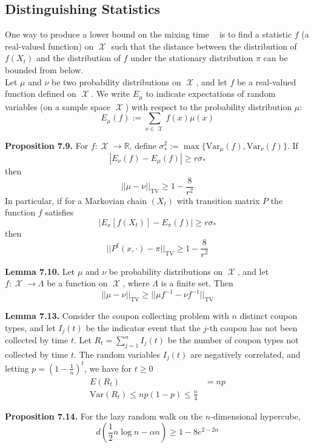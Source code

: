 \documentclass[12pt]{article}
\DeclareMathOperator*{\TV}{\text{TV}}
\DeclareMathOperator*{\mix}{t_{\text{mix}}}
\DeclareMathOperator*{\X}{\mathcal{X}}
\begin{document}
\subsection{Distinguishing Statistics}

One way to produce a lower bound on the mixing time $\mix$ is to find a statistic $f$ (a real-valued function) on $\X$ such that the distance between the distribution of $f(X_t)$ and the distribution of $f$ under the stationary distribution $\pi$ can be bounded from below.\\

Let $\mu$ and $\nu$ be two probability distributions on $\X$, and let $f$ be a real-valued function defined on $\X$. We write $E_{\mu}$ to indicate expectations of random variables (on a sample space $\X$) with respect to the probability distribution $\mu$: $$E_{\mu}(f) := \sum_{x \in \X} f(x) \mu(x)$$

\textbf{Proposition 7.9.} For $f: \X \to \mathbb{R}$, define $\sigma_*^2 := \max\{\text{Var}_{\mu}(f), \text{Var}_{\nu}(f)\}$. If $$|E_{\nu}(f) - E_{\mu}(f)| \geq r \sigma_*$$ then $$||\mu - \nu||_{\TV} \geq 1 - \frac{8}{r^2}$$ In particular, if for a Markovian chain $(X_t)$ with transition matrix $P$ the function $f$ satisfies $$|E_x[f(X_t)] - E_{\pi}(f)| \geq r \sigma_*$$ then $$||P^t(x, \cdot) - \pi||_{\TV} \geq 1 - \frac{8}{r^2}$$

\textbf{Lemma 7.10.} Let $\mu$ and $\nu$ be probability distributions on $\X$, and let $f: \X \to \Lambda$ be a function on $\X$, where $\Lambda$ is a finite set. Then $$||\mu - \nu||_{\TV} \geq ||\mu f^{-1} - \nu f^{-1}||_{\TV}$$

\textbf{Lemma 7.13.} Consider the coupon collecting problem with $n$ distinct coupon types, and let $I_j(t)$ be the indicator event that the $j$-th coupon has not been collected by time $t$. Let $R_t = \sum_{j=1}^n I_j(t)$ be the number of coupon types not collected by time $t$. The random variables $I_j(t)$ are negatively correlated, and letting $p = (1 - \frac{1}{n})^t$, we have for $t \geq 0$
\begin{align*}
E(R_t) &= np\\
\text{Var}(R_t) \leq np(1-p) \leq \frac{n}{4}
\end{align*}

\textbf{Proposition 7.14.} For the lazy random walk on the $n$-dimensional hypercube, $$d\left(\frac{1}{2} n \log n - \alpha n \right) \geq 1 - 8 e^{2 - 2\alpha}$$

\end{document}
